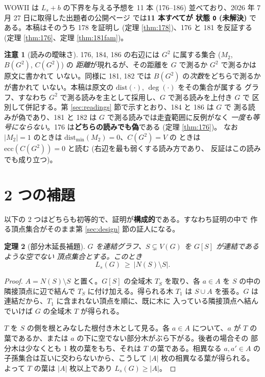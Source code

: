 \documentclass[paper=a4,fontsize=10.5pt,jafontsize=10.5pt]{jlreq}
\theoremstyle{plain}
\newtheorem{theorem}{定理}[section]
\theoremstyle{definition}
\newtheorem{remark}[theorem]{注意}
\begin{document}
WOWII は $L_s + b$ の下界を与える予想を 11 本 (176--186) 並べており、2026 年
7 月 27 日に取得した出題者の公開ページ \cite{wowii} では\textbf{11 本すべてが
状態 \texttt{O} (未解決)} である。本稿はそのうち 178 を証明し (定理 \ref{thm:178})、176 と 181 を反証する (定理 \ref{thm:176}、定理 \ref{thm:181fam})。

\begin{remark}[読みの曖昧さ]\label{rem:reading}
176, 184, 186 の右辺には $G^2$ に属する集合 ($M_2$, $B(G^2)$, $C(G^2)$) の
\emph{距離}が現れるが、その距離を $G$ で測るか $G^2$ で測るかは原文に書かれて
いない。同様に 181, 182 では $B(G^2)$ の\emph{次数}をどちらで測るかが書かれて
いない。本稿は原文の $\mathrm{dist}(\cdot)$, $\deg(\cdot)$ をその集合が属する
グラフ、すなわち $G^2$ で測る読みを主として採用し、$G$ で測る読みを上付き $G$ で
区別して併記する。第 \ref{sec:readings} 節で示すとおり、184 と 186 は $G$ で
測る読みが偽であり、181 と 182 は $G$ で測る読みでは走査範囲に反例がなく
\emph{一度も等号にならない}。176 は\textbf{どちらの読みでも偽}である (定理 \ref{thm:176})。
なお $|M_2| = 1$ のときは $\mathrm{dist}_{\min}(M_2) = 0$、$C(G^2) = V$ の
ときは $\mathrm{ecc}(C(G^2)) = 0$ と読む (右辺を最も弱くする読み方であり、
反証はこの読みでも成り立つ)。
\end{remark}

\section{2 つの補題}\label{sec:lemmas}

以下の 2 つはどちらも初等的で、証明が\textbf{構成的}である。すなわち証明の中で
作る頂点集合がそのまま第 \ref{sec:design} 節の証人になる。

\begin{theorem}[部分木延長補題]\label{thm:sub}
$G$ を連結グラフ、$S \subsetneq V(G)$ を $G[S]$ が連結であるような空でない
頂点集合とする。このとき
\[ L_s(G) \ \ge \ |N(S) \setminus S|. \]
\end{theorem}

\begin{proof}
$A = N(S) \setminus S$ と置く。$G[S]$ の全域木 $T_S$ を取り、各 $a \in A$ を
$S$ の中の隣接頂点に辺で結んで $T_S$ に付け加える。得られる木 $T_1$ は
$S \cup A$ を張る。$G$ は連結だから、$T_1$ に含まれない頂点を順に、既に木に
入っている隣接頂点へ結んでいけば $G$ の全域木 $T$ が得られる。

$T$ を $S$ の側を根とみなした根付き木として見る。各 $a \in A$ について、$a$ が
$T$ の葉であるか、または $a$ の下に空でない部分木がぶら下がる。後者の場合その
部分木は少なくとも 1 枚の葉をもち、それは $T$ の葉である。相異なる $a, a' \in A$
の子孫集合は互いに交わらないから、こうして $|A|$ 枚の相異なる葉が得られる。
よって $T$ の葉は $|A|$ 枚以上であり $L_s(G) \ge |A|$。
\end{proof}
\end{document}
